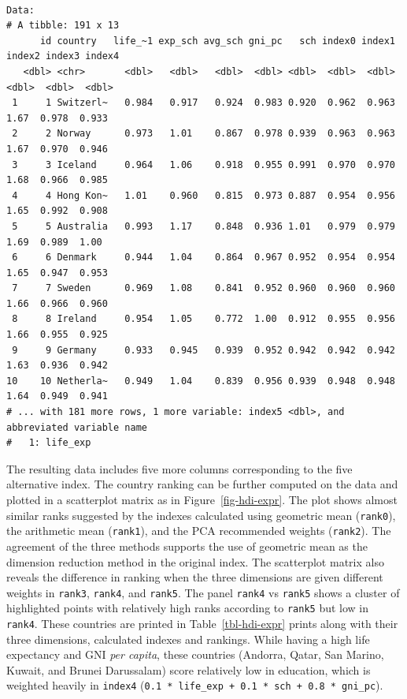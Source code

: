 \documentclass[
]{article}
\begin{document}
\begin{verbatim}

Data: 
# A tibble: 191 x 13
      id country   life_~1 exp_sch avg_sch gni_pc   sch index0 index1 index2 index3 index4
   <dbl> <chr>       <dbl>   <dbl>   <dbl>  <dbl> <dbl>  <dbl>  <dbl>  <dbl>  <dbl>  <dbl>
 1     1 Switzerl~   0.984   0.917   0.924  0.983 0.920  0.962  0.963   1.67  0.978  0.933
 2     2 Norway      0.973   1.01    0.867  0.978 0.939  0.963  0.963   1.67  0.970  0.946
 3     3 Iceland     0.964   1.06    0.918  0.955 0.991  0.970  0.970   1.68  0.966  0.985
 4     4 Hong Kon~   1.01    0.960   0.815  0.973 0.887  0.954  0.956   1.65  0.992  0.908
 5     5 Australia   0.993   1.17    0.848  0.936 1.01   0.979  0.979   1.69  0.989  1.00 
 6     6 Denmark     0.944   1.04    0.864  0.967 0.952  0.954  0.954   1.65  0.947  0.953
 7     7 Sweden      0.969   1.08    0.841  0.952 0.960  0.960  0.960   1.66  0.966  0.960
 8     8 Ireland     0.954   1.05    0.772  1.00  0.912  0.955  0.956   1.66  0.955  0.925
 9     9 Germany     0.933   0.945   0.939  0.952 0.942  0.942  0.942   1.63  0.936  0.942
10    10 Netherla~   0.949   1.04    0.839  0.956 0.939  0.948  0.948   1.64  0.949  0.941
# ... with 181 more rows, 1 more variable: index5 <dbl>, and abbreviated variable name
#   1: life_exp
\end{verbatim}

The resulting data includes five more columns corresponding to the five
alternative index. The country ranking can be further computed on the
data and plotted in a scatterplot matrix as in
Figure~\ref{fig-hdi-expr}. The plot shows almost similar ranks suggested
by the indexes calculated using geometric mean (\texttt{rank0}), the
arithmetic mean (\texttt{rank1}), and the PCA recommended weights
(\texttt{rank2}). The agreement of the three methods supports the use of
geometric mean as the dimension reduction method in the original index.
The scatterplot matrix also reveals the difference in ranking when the
three dimensions are given different weights in \texttt{rank3},
\texttt{rank4}, and \texttt{rank5}. The panel \texttt{rank4} vs
\texttt{rank5} shows a cluster of highlighted points with relatively
high ranks according to \texttt{rank5} but low in \texttt{rank4}. These
countries are printed in Table~\ref{tbl-hdi-expr} prints along with
their three dimensions, calculated indexes and rankings. While having a
high life expectancy and GNI \emph{per capita}, these countries
(Andorra, Qatar, San Marino, Kuwait, and Brunei Darussalam) score
relatively low in education, which is weighted heavily in
\texttt{index4}
(\texttt{0.1\ *\ life\_exp\ +\ 0.1\ *\ sch\ +\ 0.8\ *\ gni\_pc}).
\end{document}
